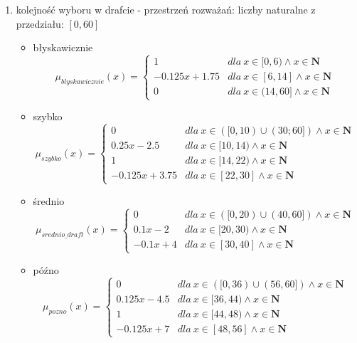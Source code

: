 \documentclass{classrep}
\begin{document}
\begin{enumerate}
    \item kolejność wyboru w drafcie - przestrzeń rozważań: liczby naturalne z przedziału: $[0, 60]$
    \begin{itemize}
        \item błyskawicznie
        \begin{equation}
            \mu_{blyskawicznie}(x) = \left\{\begin{matrix} 1 & dla \: x\in[0, 6) \wedge x\in \mathbf{N} \\ -0.125x + 1.75 & dla \: x\in [6, 14] \wedge x\in \mathbf{N} \\ 0 & dla \: x\in (14, 60] \wedge x\in \mathbf{N} \end{matrix}\right.
        \end{equation}
         \item szybko
        \begin{equation}
            \mu_{szybko}(x) = \left\{\begin{matrix} 0 & dla \: x\in ([0, 10) \cup (30;60]) \wedge x\in \mathbf{N} \\ 0.25x - 2.5 & dla \: x\in[10, 14) \wedge x\in \mathbf{N} \\ 1 & dla \: x\in [14, 22) \wedge x\in \mathbf{N} \\ -0.125x + 3.75 & dla \: x\in [22, 30] \wedge x\in \mathbf{N} \end{matrix}\right.
        \end{equation}
        \item średnio
        \begin{equation}
            \mu_{srednio\_draft}(x) = \left\{\begin{matrix} 0 & dla \: x\in ([0, 20) \cup (40, 60]) \wedge x\in \mathbf{N} \\ 0.1x - 2 & dla \: x\in[20, 30) \wedge x\in \mathbf{N} \\ -0.1x + 4 & dla \: x\in [30, 40] \wedge x\in \mathbf{N} \end{matrix}\right.
        \end{equation}
        \item późno
        \begin{equation}
            \mu_{pozno}(x) = \left\{\begin{matrix} 0 & dla \: x\in ([0, 36) \cup (56, 60]) \wedge x\in \mathbf{N} \\ 0.125x - 4.5 & dla \: x\in[36, 44) \wedge x\in \mathbf{N} \\ 1 & dla \: x\in [44, 48) \wedge x\in \mathbf{N} \\ -0.125x + 7 & dla \: x\in [48, 56] \wedge x\in \mathbf{N} \end{matrix}\right.

\end{equation}
\end{itemize}
\end{enumerate}
\end{document}
